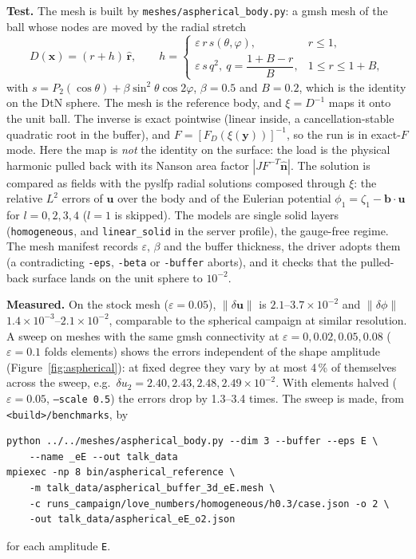 \documentclass[11pt]{article}
\numberwithin{equation}{section}
\newcommand{\eps}{\varepsilon}
\newcommand{\vu}{\mathbf{u}}
\newcommand{\vx}{\mathbf{x}}
\newcommand{\vy}{\mathbf{y}}
\newcommand{\vb}{\mathbf{b}}
\newcommand{\vn}{\hat{\mathbf{n}}}
\newcommand{\rhat}{\hat{\mathbf{r}}}
\newcommand{\code}[1]{\texttt{#1}}
\begin{document}
\textbf{Test.} The mesh is built by \code{meshes/aspherical\_body.py}:
a gmsh mesh of the ball whose nodes are moved by the radial stretch
\begin{equation}
  D(\vx) = (r+h)\,\rhat,\qquad
  h = \begin{cases} \eps\, r\, s(\theta,\varphi), & r\le 1,\\
                    \eps\, s\, q^2,\ q=\dfrac{1+B-r}{B}, & 1\le r\le 1+B,\end{cases}
  \label{eq:stretch}
\end{equation}
with $s = P_2(\cos\theta)+\beta\sin^2\theta\cos2\varphi$, $\beta=0.5$ and
$B=0.2$, which is the identity on the DtN sphere. The mesh is the reference
body, and $\xi = D^{-1}$ maps it onto the unit ball. The inverse is exact
pointwise (linear inside, a cancellation-stable quadratic root in the
buffer), and $F=[F_D(\xi(\vy))]^{-1}$, so the run is in exact-$F$ mode.
Here the map is \emph{not} the identity on the surface: the load is the
physical harmonic pulled back with its Nanson area factor
$|J F^{-T}\vn|$. The solution is compared as fields with the pyslfp radial
solutions composed through $\xi$: the relative $L^2$ errors of $\vu$ over
the body and of the Eulerian potential $\phi_1=\zeta_1-\vb\cdot\vu$ for
$l=0,2,3,4$ ($l=1$ is skipped). The models are single solid layers
(\code{homogeneous}, and \code{linear\_solid} in the server profile), the
gauge-free regime. The mesh manifest records $\eps$, $\beta$ and the buffer
thickness, the driver adopts them (a contradicting \code{-eps},
\code{-beta} or \code{-buffer} aborts), and it checks that the pulled-back
surface lands on the unit sphere to $10^{-2}$.

\textbf{Measured.} On the stock mesh ($\eps=0.05$), $\|\delta\vu\|$ is
$2.1$--$3.7\times10^{-2}$ and $\|\delta\phi\|$ $1.4\times10^{-3}$--$2.1\times10^{-2}$,
comparable to the spherical campaign at similar resolution. A sweep on
meshes with the same gmsh connectivity at $\eps=0,0.02,0.05,0.08$
($\eps=0.1$ folds elements) shows the errors independent of the shape
amplitude (Figure~\ref{fig:aspherical}): at fixed degree they vary by at
most 4\,\% of themselves across the sweep, e.g.\
$\delta u_2 = 2.40, 2.43, 2.48, 2.49\times10^{-2}$. With elements halved
($\eps=0.05$, \code{--scale 0.5}) the errors drop by 1.3--3.4 times. The
sweep is made, from \code{<build>/benchmarks}, by
\begin{verbatim}
python ../../meshes/aspherical_body.py --dim 3 --buffer --eps E \
    --name _eE --out talk_data
mpiexec -np 8 bin/aspherical_reference \
    -m talk_data/aspherical_buffer_3d_eE.mesh \
    -c runs_campaign/love_numbers/homogeneous/h0.3/case.json -o 2 \
    -out talk_data/aspherical_eE_o2.json
\end{verbatim}
for each amplitude \code{E}.
\end{document}
